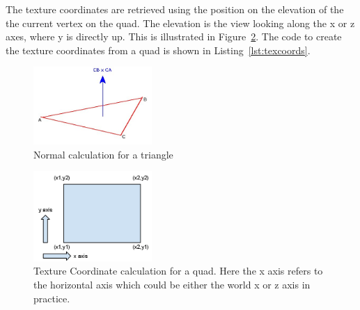 

The texture coordinates are retrieved using the position on the elevation of the the current vertex on the quad.
The elevation is the view looking along the x or z axes, where y is directly up.
This is illustrated in Figure~\ref{fig:texcoords}.
The code to create the texture coordinates from a quad is shown in Listing~\ref{lst:texcoords}.

\begin{figure}
  \centering
  \includegraphics[width=0.4\textwidth]{images/Normal01}
  \caption{Normal calculation for a triangle}
  \label{fig:normal}
\end{figure}

\begin{figure}
  \centering
  \includegraphics[width=0.4\textwidth]{images/texcoords}
  \caption{Texture Coordinate calculation for a quad. Here the x axis refers to the horizontal axis which could be either the world x or z axis in practice.}
  \label{fig:texcoords}
\end{figure}



